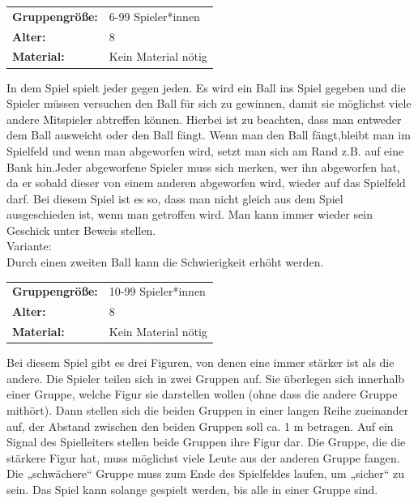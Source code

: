 

\begin{table}[H]
\begin{tabular}{>{\bfseries}lp{8cm}}
   Gruppengröße:   & 6-99 Spieler*innen\\
    Alter: & 8 \\
    Material: & Kein Material nötig \\ 
\end{tabular}
\end{table} 
 In dem Spiel spielt jeder gegen jeden. Es wird ein Ball ins Spiel gegeben und die Spieler müssen versuchen den Ball für sich zu gewinnen, damit sie möglichst viele andere Mitspieler abtreffen können. Hierbei ist zu beachten, dass man entweder dem Ball ausweicht oder den Ball fängt. Wenn man den Ball fängt,bleibt man im Spielfeld und wenn man abgeworfen wird, setzt man sich am Rand z.B. auf eine Bank hin.Jeder abgeworfene Spieler muss sich merken, wer ihn abgeworfen hat, da er sobald dieser von einem anderen abgeworfen wird, wieder auf das Spielfeld darf. Bei diesem Spiel ist es so, dass man nicht gleich aus dem Spiel ausgeschieden ist, wenn man getroffen wird. Man kann immer wieder sein Geschick unter Beweis stellen. \\ \newline
    Variante: \\ Durch einen zweiten Ball kann die Schwierigkeit erhöht werden.\\


\newpage

\begin{table}[H]
\begin{tabular}{>{\bfseries}lp{8cm}}
   Gruppengröße:   & 10-99 Spieler*innen\\
    Alter: & 8 \\
    Material: & Kein Material nötig \\
\end{tabular}
\end{table} 
 Bei diesem Spiel gibt es drei Figuren, von denen eine immer stärker ist als die andere. Die Spieler teilen sich in zwei Gruppen auf. Sie überlegen sich innerhalb einer Gruppe, welche Figur sie darstellen wollen (ohne dass die andere Gruppe mithört). Dann stellen sich die beiden Gruppen in einer langen Reihe zueinander auf, der Abstand zwischen den beiden Gruppen soll ca. 1 m betragen. Auf ein Signal des Spielleiters stellen beide Gruppen ihre Figur dar. Die Gruppe, die die stärkere Figur hat, muss möglichst viele Leute aus der anderen Gruppe fangen.  Die „schwächere“ Gruppe muss zum Ende des Spielfeldes laufen, um „sicher“ zu sein. Das Spiel kann solange gespielt werden, bis alle in einer Gruppe sind.\newline


